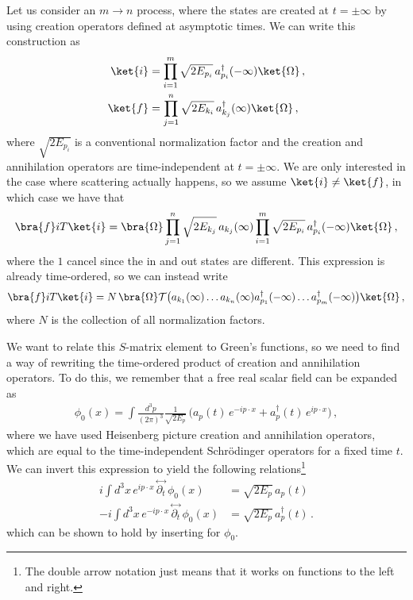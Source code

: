 Let us consider an $m\rightarrow n$ process, where the states are created at $t=\pm\infty$ by using creation operators defined at asymptotic times. We can write this construction as
\begin{align}
    \ket{i}&=\prod_{i=1}^{m}\sqrt{2E_{p_i}}\,a_{p_i}^{\dagger}(-\infty)\ket{\Omega}\,,
    \\
    \ket{f}&=\prod_{j=1}^{n}\sqrt{2E_{k_i}}\,a_{k_{j}}^{\dagger}(\infty)\ket{\Omega}\,,
\end{align}
where $\sqrt{2E_{p_i}}$ is a conventional normalization factor and the creation and annihilation operators are time-independent at $t=\pm\infty$. We are only interested in the case where scattering actually happens, so we assume $\ket{i}\neq\ket{f}$, in which case we have that
\begin{align}
    \bra{f}iT\ket{i}=\bra{\Omega}\prod_{j=1}^{n}\sqrt{2E_{k_j}}\,a_{k_{j}}(\infty)\prod_{i=1}^{m}\sqrt{2E_{p_i}}\,a_{p_i}^{\dagger}(-\infty)\ket{\Omega}\,,
\end{align}
where the $1$ cancel since the in and out states are different. This expression is already time-ordered, so we can instead write 
\begin{align}\label{eq:time ordered creation product}
    \bra{f}iT\ket{i}=N\,\bra{\Omega}\mathcal{T}\big(a_{k_{1}}(\infty)\dots a_{k_{n}}(\infty)a_{p_1}^{\dagger}(-\infty)\dots a_{p_m}^{\dagger}(-\infty)\big)\ket{\Omega}\,,
\end{align}
where $N$ is the collection of all normalization factors.  

We want to relate this $S$-matrix element to Green's functions, so we need to find a way of rewriting the time-ordered product of creation and annihilation operators. To do this, we remember that a free real scalar field can be expanded as
\begin{align}
    \phi_{0}(x)=\int \frac{d^{3}p}{(2\pi)^{3}}\frac{1}{\sqrt{2E_{p}}}\,\big(a_{p}(t)\,e^{-ip\cdot x}+a_{p}^{\dagger}(t)\,e^{ip\cdot x}\big)\,,
\end{align}
where we have used Heisenberg picture creation and annihilation operators, which are equal to the time-independent Schrödinger operators for a fixed time $t$. We can invert this expression to yield the following relations\footnote{The double arrow notation just means that it works on functions to the left and right.}
\begin{align}
    i\int d^{3}x\,e^{ip\cdot x}\,\overset{\leftrightarrow}{\partial_{t}}\,\phi_{0}(x)&=\sqrt{2E_{p}}\,a_{p}(t)\label{eq:creation relation 1}
    \\
    -i\int d^{3}x\,e^{-ip\cdot x}\,\overset{\leftrightarrow}{\partial_{t}}\,\phi_{0}(x)&=\sqrt{2E_{p}}\,a_{p}^{\dagger}(t)\,.\label{eq:creation relation 2}
\end{align}
which can be shown to hold by inserting for $\phi_{0}$.

